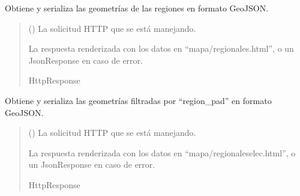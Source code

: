 \documentclass[letterpaper,10pt,spanish]{sphinxmanual}
\begin{document}
\begin{fulllineitems}

\pysigstartsignatures
{}
\pysigstopsignatures
\sphinxAtStartPar
Obtiene y serializa las geometrías de las regiones en formato GeoJSON.
\begin{quote}\begin{description}
\sphinxAtStartPar
{} () \textendash{} La solicitud HTTP que se está manejando.

\sphinxAtStartPar
La respuesta renderizada con los datos en “mapa/regionales.html”, o un JsonResponse en caso de error.

\sphinxAtStartPar
HttpResponse

\end{description}\end{quote}

\end{fulllineitems}



\begin{fulllineitems}

\pysigstartsignatures
{}
\pysigstopsignatures
\sphinxAtStartPar
Obtiene y serializa las geometrías filtradas por “region\_pad” en formato GeoJSON.
\begin{quote}\begin{description}
\sphinxAtStartPar
{} () \textendash{} La solicitud HTTP que se está manejando.

\sphinxAtStartPar
La respuesta renderizada con los datos en “mapa/regionaleselec.html”, o un JsonResponse en caso de error.

\sphinxAtStartPar
HttpResponse

\end{description}\end{quote}

\end{fulllineitems}
\end{document}
